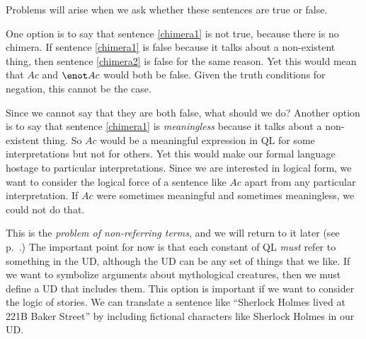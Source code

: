 Problems will arise when we ask whether these sentences are true or false.

One option is to say that sentence \ref{chimera1} is not true, because there is no chimera. If sentence \ref{chimera1} is false because it talks about a non-existent thing, then sentence \ref{chimera2} is false for the same reason. Yet this would mean that $Ac$ and $\enot Ac$ would both be false. Given the truth conditions for negation, this cannot be the case.

Since we cannot say that they are both false, what should we do? Another option is to say that sentence \ref{chimera1} is \emph{meaningless} because it talks about a non-existent thing. So $Ac$ would be a meaningful expression in QL for some interpretations but not for others. Yet this would make our formal language hostage to particular interpretations. Since we are interested in logical form, we want to consider the logical force of a sentence like $Ac$ apart from any particular interpretation. If $Ac$ were sometimes meaningful and sometimes meaningless, we could not do that.

This is the \emph{problem of non-referring terms}, and we will return to it later (see p.~\pageref{subsec.defdesc}.) The important point for now is that each constant of QL \emph{must} refer to something in the UD, although the UD can be any set of things that we like. If we want to symbolize arguments about mythological creatures, then we must define a UD that includes them. This option is important if we want to consider the logic of stories. We can translate a sentence like ``Sherlock Holmes lived at 221B Baker Street'' by including fictional characters like Sherlock Holmes in our UD.


